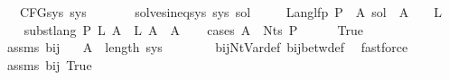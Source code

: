 \begin{isabellebody}
\ \ \ {\isachardoublequoteopen}CFG{\isacharunderscore}{\kern0pt}sys\ sys{\isachardoublequoteclose}\isanewline
\ \ \ \ \ \ \ {\isachardoublequoteopen}solves{\isacharunderscore}{\kern0pt}ineq{\isacharunderscore}{\kern0pt}sys\ sys\ sol{\isacharprime}{\kern0pt}{\isachardoublequoteclose}\isanewline
\ \ \ \ \ {\isachardoublequoteopen}Lang{\isacharunderscore}{\kern0pt}lfp\ P\ {\isasymle}\ {\isacharparenleft}{\kern0pt}{\isasymlambda}A{\isachardot}{\kern0pt}\ sol{\isacharprime}{\kern0pt}\ {\isacharparenleft}{\kern0pt}{\isasymgamma}{\isacharprime}{\kern0pt}\ A{\isacharparenright}{\kern0pt}{\isacharparenright}{\kern0pt}{\isachardoublequoteclose}\ {\isacharparenleft}{\kern0pt}\ {\isachardoublequoteopen}{\isacharunderscore}{\kern0pt}\ {\isasymle}\ {\isacharquery}{\kern0pt}L{\isacharprime}{\kern0pt}{\isachardoublequoteclose}{\isacharparenright}{\kern0pt}\isanewline
%
\isadelimproof
%
\endisadelimproof
%
\isatagproof
{}\isamarkupfalse%
\ {\isacharminus}{\kern0pt}\isanewline
\ \ \isamarkupfalse%
\ {\isachardoublequoteopen}subst{\isacharunderscore}{\kern0pt}lang\ P\ {\isacharquery}{\kern0pt}L{\isacharprime}{\kern0pt}\ A\ {\isasymsubseteq}\ {\isacharquery}{\kern0pt}L{\isacharprime}{\kern0pt}\ A{\isachardoublequoteclose}\ \ A\isanewline
\ \ \isamarkupfalse%
\ {\isacharparenleft}{\kern0pt}cases\ {\isachardoublequoteopen}A\ {\isasymin}\ Nts\ P{\isachardoublequoteclose}{\isacharparenright}{\kern0pt}\isanewline
\ \ \ \ \isamarkupfalse%
\ True\isanewline
\ \ \ \ \isamarkupfalse%
\ assms{\isacharparenleft}{\kern0pt}{}{\isacharparenright}{\kern0pt}\ bij{\isacharunderscore}{\kern0pt}{\isasymgamma}{\isacharunderscore}{\kern0pt}{\isasymgamma}{\isacharprime}{\kern0pt}\ \isamarkupfalse%
\ {\isachardoublequoteopen}{\isasymgamma}{\isacharprime}{\kern0pt}\ A\ {\isacharless}{\kern0pt}\ length\ sys{\isachardoublequoteclose}\isanewline
\ \ \ \ \ \ \isamarkupfalse%
\ bij{\isacharunderscore}{\kern0pt}Nt{\isacharunderscore}{\kern0pt}Var{\isacharunderscore}{\kern0pt}def\ bij{\isacharunderscore}{\kern0pt}betw{\isacharunderscore}{\kern0pt}def\ \isamarkupfalse%
\ fastforce\isanewline
\ \ \ \ \isamarkupfalse%
\ assms{\isacharparenleft}{\kern0pt}{}{\isacharparenright}{\kern0pt}\ bij{\isacharunderscore}{\kern0pt}{\isasymgamma}{\isacharunderscore}{\kern0pt}{\isasymgamma}{\isacharprime}{\kern0pt}\ True\ \isamarkupfalse%

\end{isabellebody}
